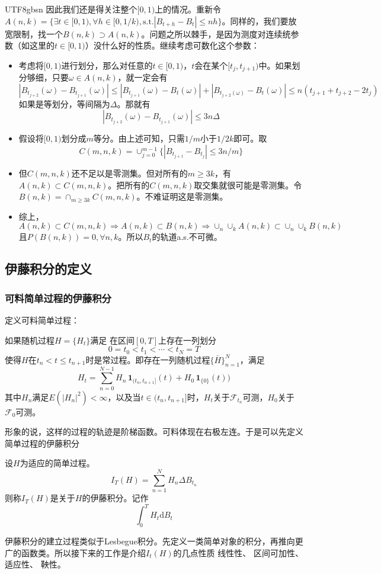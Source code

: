 \documentclass{article}
\begin{document}
\begin{CJK*}{UTF8}{gbsn}
因此我们还是得关注整个$[0,1)$上的情况。重新令$A(n,k)={\{\exists t\in[0,1),\forall h\in[0,1/k),\text{s.t.}|B_{t+h}-B_t|\le nh\}}$。同样的，我们要放宽限制，找一个$B(n,k)\supset A(n,k)$。问题之所以棘手，是因为测度对连续统参数（如这里的$t\in[0,1)$）没什么好的性质。继续考虑可数化这个参数：
\begin{itemize}
    \item 考虑将$[0,1)$进行划分，那么对任意的$t\in[0,1)$，$t$会在某个$[t_j,t_{j+1})$中。如果划分够细，只要$\omega\in A(n,k)$，就一定会有
    $$|B_{t_{j+2}}(\omega)-B_{t_{j+1}}(\omega)|\le|B_{t_{j+1}}(\omega)-B_t(\omega)|+|B_{t_{j+2}(\omega)}-B_t(\omega)|\le n(t_{j+1}+t_{j+2}-2t_j) $$
    如果是等划分，等间隔为$\Delta$。那就有
    $$|B_{t_{j+2}}(\omega)-B_{t_{j+1}}(\omega)|\le 3n\Delta $$
    \item 假设将$[0,1)$划分成$m$等分。由上述可知，只需$1/m$小于$1/2k$即可。取
    $$C(m,n,k)=\cup_{j=0}^{m-1}\{|B_{t_{j+1}}-B_{t_{j}}|\le 3n/m\}$$
    \item 但$C(m,n,k)$还不足以是零测集。但对所有的$m\ge3k$，有$A(n,k)\subset C(m,n,k)$。把所有的$C(m,n,k)$取交集就很可能是零测集。令$B(n,k)=\cap_{m\ge3k}C(m,n,k)$。不难证明这是零测集。
    \item 综上，$$A(n,k)\subset C(m,n,k)\Rightarrow A(n,k)\subset B(n,k)\Rightarrow \cup_n\cup_kA(n,k)\subset \cup_n\cup_kB(n,k)$$
    且$P(B(n,k))=0,\forall n,k$。所以$B_t$的轨道a.s.不可微。
\end{itemize}


\subsection{伊藤积分的定义}
\subsubsection{可料简单过程的伊藤积分}
定义可料简单过程：
\begin{definition}
如果随机过程$H=\{H_t\}$满足
    在区间$[0,T]$上存在一列划分
    $$0=t_0<t_1<\cdots<t_N=T$$使得$H$在$t_n< t\le t_{n+1}$时是常过程。即存在一列随机过程$\{\bar{H}\}_{n=1}^N$，满足
    $$
    H_t=\sum_{n=0}^{N-1}H_n\,\mathbf{1}_{(t_n,t_{n+1}]}(t)+H_0\,\mathbf{1}_{\{0\}}(t))
    $$
    其中$H_n$满足$E(|H_n|^2)<\infty$，以及当$t\in(t_n,t_{n+1}]$时，$H_t$关于$\mathcal{F}_{t_n}$可测，$H_0$关于$\mathcal{F}_0$可测。
\end{definition}
形象的说，这样的过程的轨迹是阶梯函数。可料体现在右极左连。于是可以先定义简单过程的伊藤积分
\begin{definition}[简单过程的伊藤过程]
设$H$为适应的简单过程。
    $$I_T(H)=\sum_{n=1}^N H_n\Delta B_{t_n}
    $$
    则称$I_T(H)$是关于$H$的伊藤积分。记作
    $$
    \int_0^TH_t\mathrm{d}B_t
    $$
\end{definition}
伊藤积分的建立过程类似于Lesbegue积分。先定义一类简单对象的积分，再推向更广的函数类。所以接下来的工作是介绍$I_t(H)$的几点性质
线性性、
区间可加性、
适应性、
鞅性。


\end{CJK*}
\end{document}
